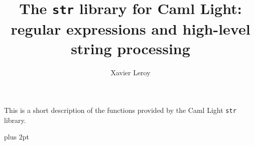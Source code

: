 
\title{The {\tt str} library for Caml Light: \\
       regular expressions and high-level string processing}
\author{Xavier Leroy}

\def\comment{\list{}{}\item[]}
\def\endcomment{\endlist}

\def\library{
\begin{raggedright}
\def\@listI{\leftmargin\leftmargini \parsep 4.5pt plus 2pt minus 1pt%
\topsep 3pt plus 1pt minus 1pt%
\itemsep 0pt}
\topsep 2pt plus 2pt
\partopsep 0pt
}

\def\endlibrary{
\end{raggedright}}

\let\mysection=\section



\maketitle

This is a short description of the functions provided by the Caml
Light {\tt str} library.

\begin{library}

\end{library}


